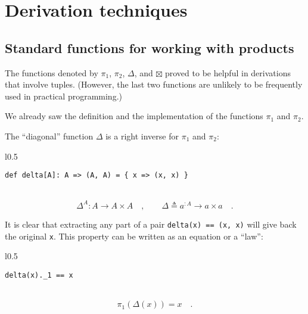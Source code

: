 \section{Derivation techniques}

\subsection{Standard functions for working with products}

The functions denoted by $\pi_{1}$, $\pi_{2}$, $\Delta$, and $\boxtimes$
proved to be helpful in derivations that involve tuples. (However,
the last two functions are unlikely to be frequently used in practical
programming.) 

We already saw the definition and the implementation of the functions
$\pi_{1}$ and $\pi_{2}$. 

The \textsf{``}diagonal\textsf{''} function $\Delta$ is a right inverse for $\pi_{1}$
and $\pi_{2}$:

\begin{wrapfigure}{l}{0.5\columnwidth}%
\vspace{-0.65\baselineskip}
\begin{lstlisting}
def delta[A]: A => (A, A) = { x => (x, x) }
\end{lstlisting}

\vspace{-0.25\baselineskip}
\end{wrapfigure}%

~\vspace{-1.15\baselineskip}
\[
\Delta^{A}:A\rightarrow A\times A\quad,\quad\quad\Delta\triangleq a^{:A}\rightarrow a\times a\quad.
\]
\vspace{-1.15\baselineskip}

It is clear that extracting any part of a pair \lstinline!delta(x) == (x, x)!
will give back the original \lstinline!x!. This property can be written
as an equation or a \textsf{``}law\textsf{''}:

\begin{wrapfigure}{l}{0.5\columnwidth}%
\vspace{-0.65\baselineskip}
\begin{lstlisting}
delta(x)._1 == x
\end{lstlisting}

\vspace{-0.25\baselineskip}
\end{wrapfigure}%

~\vspace{-0.35\baselineskip}
\[
\pi_{1}(\Delta(x))=x\quad.
\]
\vspace{-0.85\baselineskip}

